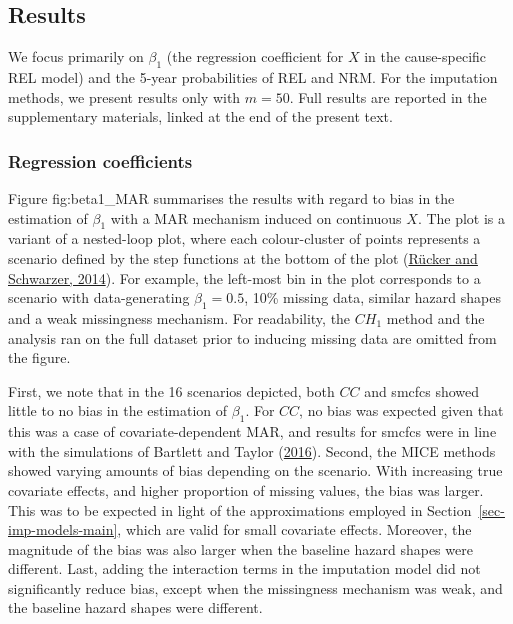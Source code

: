 \documentclass[
  letterpaper,
  DIV=11,
  numbers=noendperiod]{scrreprt}
\begin{document}
\hypertarget{results-1}{%
\subsection{Results}\label{results-1}}

We focus primarily on \(\beta_1\) (the regression coefficient for \(X\)
in the cause-specific REL model) and the 5-year probabilities of REL and
NRM. For the imputation methods, we present results only with
\(m = 50\). Full results are reported in the supplementary materials,
linked at the end of the present text.

\hypertarget{regression-coefficients-1}{%
\subsubsection{Regression
coefficients}\label{regression-coefficients-1}}

Figure fig:beta1\_MAR summarises the results with regard to bias in the
estimation of \(\beta_1\) with a MAR mechanism induced on continuous
\(X\). The plot is a variant of a nested-loop plot, where each
colour-cluster of points represents a scenario defined by the step
functions at the bottom of the plot
(\protect\hyperlink{ref-ruckerPresentingSimulationResults2014}{Rücker
and Schwarzer, 2014}). For example, the left-most bin in the plot
corresponds to a scenario with data-generating \(\beta_1 = 0.5\), 10\%
missing data, similar hazard shapes and a weak missingness mechanism.
For readability, the \(CH_{1}\) method and the analysis ran on the full
dataset prior to inducing missing data are omitted from the figure.

First, we note that in the 16 scenarios depicted, both \(CC\) and smcfcs
showed little to no bias in the estimation of \(\beta_1\). For \(CC\),
no bias was expected given that this was a case of covariate-dependent
MAR, and results for smcfcs were in line with the simulations of
Bartlett and Taylor
(\protect\hyperlink{ref-bartlettMissingCovariatesCompeting2016}{2016}).
Second, the MICE methods showed varying amounts of bias depending on the
scenario. With increasing true covariate effects, and higher proportion
of missing values, the bias was larger. This was to be expected in light
of the approximations employed in Section~\ref{sec-imp-models-main},
which are valid for small covariate effects. Moreover, the magnitude of
the bias was also larger when the baseline hazard shapes were different.
Last, adding the interaction terms in the imputation model did not
significantly reduce bias, except when the missingness mechanism was
weak, and the baseline hazard shapes were different.
\end{document}
